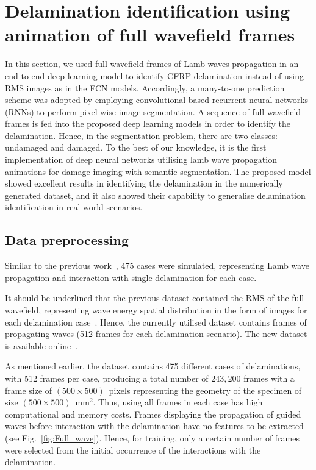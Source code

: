 \section{Delamination identification using animation of full wavefield frames}
\label{sec44}
In this section, we used full wavefield frames of Lamb waves propagation in an end-to-end deep learning model to identify CFRP delamination instead of using RMS images as in the FCN models.
Accordingly, a many-to-one prediction scheme was adopted by employing convolutional-based recurrent neural networks (RNNs) to perform pixel-wise image segmentation.
A sequence of full wavefield frames is fed into the proposed deep learning models in order to identify the delamination.
Hence, in the segmentation problem, there are two classes: undamaged and damaged.
To the best of our knowledge, it is the first implementation of deep neural networks utilising lamb wave propagation animations for damage imaging with semantic segmentation.
The proposed model showed excellent results in identifying the delamination in the numerically generated dataset, and it also showed their capability to generalise delamination identification in real world scenarios.
\subsection{Data preprocessing}
Similar to the previous work~\cite{Ijjeh2021}, 475 cases were simulated, representing Lamb wave propagation and interaction with single delamination for each case. 

It should be underlined that the previous dataset contained the RMS of the full wavefield, representing wave energy spatial distribution in the form of images for each delamination case~\cite{Kudela2020d}.
Hence, the currently utilised dataset contains frames of propagating waves (512 frames for each delamination scenario).
The new dataset is available online~\cite{kudela_pawel_2021_5414555}.

As mentioned earlier, the dataset contains 475 different cases of delaminations, with 512 frames per case, producing a total number of 243,\,200 frames with a frame size of \((500\times500)\)~pixels representing the geometry of the specimen of size \((500\times500)\)~mm\(^{2}\).
Thus, using all frames in each case has high computational and memory costs.
Frames displaying the propagation of guided waves before interaction with the delamination have no features to be extracted (see Fig.~\ref{fig:Full_wave}).
Hence, for training, only a certain number of frames were selected from the initial occurrence of the interactions with the delamination.

